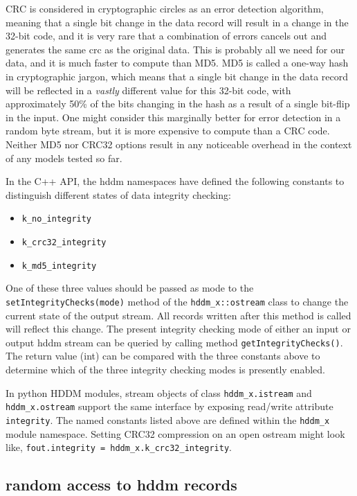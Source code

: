\documentclass{revtex4}
\begin{document}
CRC is considered in cryptographic circles as an error detection algorithm,
meaning that a single bit change in the data record will result in a
change in the 32-{}bit code, and it is very rare that a combination of
errors cancels out and generates the same crc as the original data. This
is probably all we need for our data, and it is much faster to compute than
MD5. MD5 is called a one-{}way hash in cryptographic jargon, which means that
a single bit change in the data record will be reflected in a {\em vastly}
different value for this 32-{}bit code, with approximately 50\% of the bits
changing in the hash as a result of a single bit-{}flip in the input. One might
consider this marginally better for error detection in a random byte stream,
but it is more expensive to compute than a CRC code. Neither MD5 nor CRC32
options result in any noticeable overhead in the context of any models tested
so far.

In the C++ API, the hddm namespaces have defined the following constants to
distinguish different states of data integrity checking:

\begin{itemize}
\item \texttt{k\_no\_integrity}
\item \texttt{k\_crc32\_integrity}
\item \texttt{k\_md5\_integrity}
\end{itemize}

One of these three values should be passed as mode to the 
\texttt{setIntegrityChecks(mode)} method of the \texttt{hddm\_x::ostream}
class to change the current state of the output stream. All records written
after this method is called will reflect this change. The present integrity
checking mode of either an input or output hddm stream can be queried by
calling method \texttt{getIntegrityChecks()}. The return value (int) can
be compared with the three constants above to determine which of the three
integrity checking modes is presently enabled.

In python HDDM modules, stream objects of class \texttt{hddm\_x.istream}
and \texttt{hddm\_x.ostream} support the same interface by exposing read/write
attribute \texttt{integrity}. The named constants listed above are defined
within the \texttt{hddm\_x} module namespace. Setting CRC32 compression on
an open ostream might look like, \texttt{fout.integrity = hddm\_x.k\_crc32\_integrity}.

\subsection{random access to hddm records}
\end{document}
